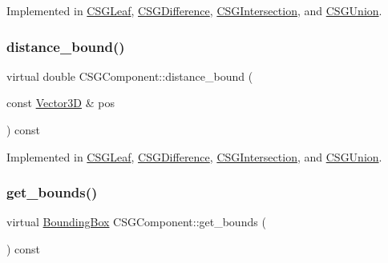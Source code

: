 Implemented in \mbox{\hyperlink{classCSGLeaf_aa5142f7259d9a5d4e38797346bb6e640}{C\+S\+G\+Leaf}}, \mbox{\hyperlink{classCSGDifference_a8ea1d4cd7fc1ff6adca5cc4983eecfcd}{C\+S\+G\+Difference}}, \mbox{\hyperlink{classCSGIntersection_a4721227de85e675484ab206c299c5867}{C\+S\+G\+Intersection}}, and \mbox{\hyperlink{classCSGUnion_a806fa004753847d293e56a93112abe9a}{C\+S\+G\+Union}}.

\mbox{\label{classCSGComponent_a41ca7aff9b7c481ea076f81eeb826779}} 
\subsubsection{\texorpdfstring{distance\_bound()}{distance\_bound()}}
{\footnotesize\ttfamily virtual double C\+S\+G\+Component\+::distance\+\_\+bound (\begin{DoxyParamCaption}\item[{const \mbox{\hyperlink{classVector3D}{Vector3D}} \&}]{pos }\end{DoxyParamCaption}) const\hspace{0.3cm}{\ttfamily [pure virtual]}}



Implemented in \mbox{\hyperlink{classCSGLeaf_a78d00f0c35cd87b222da10fb728037eb}{C\+S\+G\+Leaf}}, \mbox{\hyperlink{classCSGDifference_a66e0be492572f75b508a77c429be8fd8}{C\+S\+G\+Difference}}, \mbox{\hyperlink{classCSGIntersection_a199cc8192cdaeacae17d5b3c6dfef6a1}{C\+S\+G\+Intersection}}, and \mbox{\hyperlink{classCSGUnion_a2a15937802a57a3a78b84961fc0dda9f}{C\+S\+G\+Union}}.

\mbox{\label{classCSGComponent_a4299365f2bab69272af9de4f2bee7cdb}} 
\subsubsection{\texorpdfstring{get\_bounds()}{get\_bounds()}}
{\footnotesize\ttfamily virtual \mbox{\hyperlink{classBoundingBox}{Bounding\+Box}} C\+S\+G\+Component\+::get\+\_\+bounds (\begin{DoxyParamCaption}{ }\end{DoxyParamCaption}) const\hspace{0.3cm}{\ttfamily [pure virtual]}}



